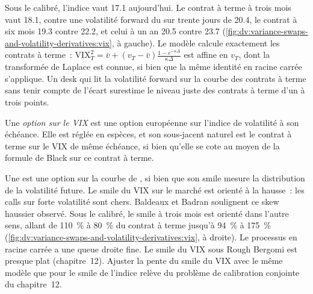 \begin{example}\label{ex:dv:variance-swaps-and-volatility-derivatives:vixcurve}
Sous le  calibré, l'indice vaut 17.1 aujourd'hui. Le contrat à terme à trois mois vaut 18.1, contre une
volatilité forward du  sur trente jours de 20.4, le contrat à six mois 19.3 contre 22.2, et celui à un an 20.5 contre 23.7
(\cref{fig:dv:variance-swaps-and-volatility-derivatives:vix}, à gauche). Le modèle calcule exactement les contrats à terme~:
$\mathrm{VIX}_T^2=\bar v+(v_T-\bar v)\frac{1-e^{-\kappa\Delta}}{\kappa\Delta}$ est affine en $v_T$, dont la
transformée de Laplace est connue, si bien que la même identité en racine carrée s'applique. Un desk qui lit la volatilité forward sur la
courbe des contrats à terme sans tenir compte de l'écart surestime le niveau juste des contrats à terme d'un à trois points.
\end{example}

\begin{definition}\label{def:dv:variance-swaps-and-volatility-derivatives:vixopt}
Une \emph{option sur le VIX} est une option européenne sur l'indice de volatilité à son échéance. Elle est
réglée en espèces, et son sous-jacent naturel est le contrat à terme sur le VIX de même échéance, si bien qu'elle se cote au moyen de la
formule de Black sur ce contrat à terme.
\end{definition}

Une  est une option sur la courbe de , si bien que son smile mesure la distribution de la
volatilité future. Le smile du VIX sur le marché est orienté à la hausse~: les calls sur forte volatilité sont chers. Baldeaux et Badran
soulignent ce skew haussier observé. Sous le  calibré, le smile à trois mois est orienté dans l'autre sens,
allant de 110~\% à 80~\% du contrat à terme jusqu'à 94~\% à 175~\%
(\cref{fig:dv:variance-swaps-and-volatility-derivatives:vix}, à droite). Le processus en racine carrée a une queue
droite fine. Le smile du VIX sous Rough Bergomi est presque plat (chapitre~12). Ajuster la pente du smile du VIX avec le même modèle que pour
le smile de l'indice relève du problème de calibration conjointe du chapitre~12.

